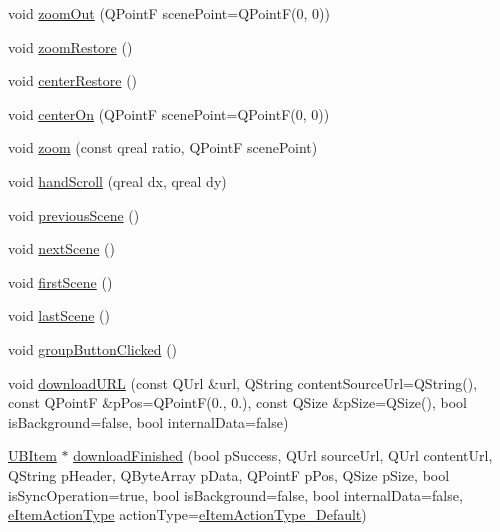 \begin{DoxyCompactItemize}
\item 
void \hyperlink{class_u_b_board_controller_adb10d5b0dbccf7ccb1b92f8840ad3621}{zoom\-Out} (Q\-Point\-F scene\-Point=Q\-Point\-F(0, 0))
\item 
void \hyperlink{class_u_b_board_controller_a0df0eca517bd4e5754f49ce1395ec1b1}{zoom\-Restore} ()
\item 
void \hyperlink{class_u_b_board_controller_a05fa2d82c7201cf4d833b4a6366db700}{center\-Restore} ()
\item 
void \hyperlink{class_u_b_board_controller_adbaa867e0f26de80826355c25fe41d82}{center\-On} (Q\-Point\-F scene\-Point=Q\-Point\-F(0, 0))
\item 
void \hyperlink{class_u_b_board_controller_ade5522bea3f3045a0da1dda6853b3cce}{zoom} (const qreal ratio, Q\-Point\-F scene\-Point)
\item 
void \hyperlink{class_u_b_board_controller_a313ec9c04c62913c305ac521ae649467}{hand\-Scroll} (qreal dx, qreal dy)
\item 
void \hyperlink{class_u_b_board_controller_aeef919027b89d95c392a7e0fe5a6444d}{previous\-Scene} ()
\item 
void \hyperlink{class_u_b_board_controller_ab5d4e87dcef6ff72e804f6cb5a26a8f3}{next\-Scene} ()
\item 
void \hyperlink{class_u_b_board_controller_a92730653a91693d5d1e6b626a0e0cf4d}{first\-Scene} ()
\item 
void \hyperlink{class_u_b_board_controller_aa5a7d737c2dcd83fe9d6ab1c897fd5ee}{last\-Scene} ()
\item 
void \hyperlink{class_u_b_board_controller_a97432044e27c3063f8e46bcb31d75d65}{group\-Button\-Clicked} ()
\item 
void \hyperlink{class_u_b_board_controller_a358f3f88d1fa9e41620170d76a806f93}{download\-U\-R\-L} (const Q\-Url \&url, Q\-String content\-Source\-Url=Q\-String(), const Q\-Point\-F \&p\-Pos=Q\-Point\-F(0., 0.), const Q\-Size \&p\-Size=Q\-Size(), bool is\-Background=false, bool internal\-Data=false)
\item 
\hyperlink{class_u_b_item}{U\-B\-Item} $\ast$ \hyperlink{class_u_b_board_controller_ab6cbc7bda85279e7eee5c5923892dd1a}{download\-Finished} (bool p\-Success, Q\-Url source\-Url, Q\-Url content\-Url, Q\-String p\-Header, Q\-Byte\-Array p\-Data, Q\-Point\-F p\-Pos, Q\-Size p\-Size, bool is\-Sync\-Operation=true, bool is\-Background=false, bool internal\-Data=false, \hyperlink{_u_b_board_controller_8h_a81078322485d3c56644c4f3414ac1c91}{e\-Item\-Action\-Type} action\-Type=\hyperlink{_u_b_board_controller_8h_a81078322485d3c56644c4f3414ac1c91abca7f0295fd0737e3216ce238a870c29}{e\-Item\-Action\-Type\-\_\-\-Default})

\end{DoxyCompactItemize}

